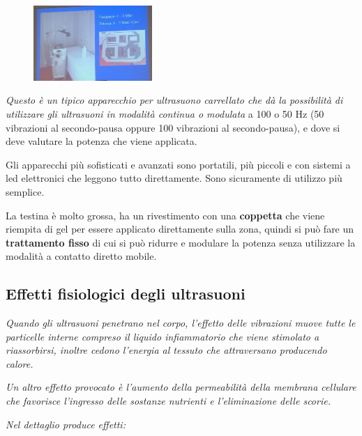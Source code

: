 \begin{figure}[!ht]
\centering
\includegraphics[width=0.4\textwidth]{024/image2.jpeg}
\end{figure}

\emph{Questo
è un tipico apparecchio per ultrasuono carrellato che dà la possibilità
di utilizzare gli ultrasuoni in modalità continua o modulata} a 100 o 50
Hz (50 vibrazioni al secondo-pausa oppure 100 vibrazioni al
secondo-pausa), e dove si deve valutare la potenza che viene applicata.

Gli apparecchi più sofisticati e avanzati sono portatili, più piccoli e
con sistemi a led elettronici che leggono tutto direttamente. Sono
sicuramente di utilizzo più semplice.

La testina è molto grossa, ha un rivestimento con una \textbf{coppetta}
che viene riempita di gel per essere applicato direttamente sulla zona,
quindi si può fare un \textbf{trattamento fisso} di cui si può ridurre e
modulare la potenza senza utilizzare la modalità a contatto diretto
mobile.

\subsection{Effetti fisiologici degli ultrasuoni}

\emph{Quando gli ultrasuoni penetrano nel corpo, l'effetto delle
vibrazioni muove tutte le particelle interne compreso il liquido
infiammatorio che viene stimolato a riassorbirsi, inoltre cedono
l'energia al tessuto che attraversano producendo calore.}

\emph{Un altro effetto provocato è l'aumento della permeabilità della
membrana cellulare che favorisce l'ingresso delle sostanze nutrienti e
l'eliminazione delle scorie.}

\emph{Nel dettaglio produce effetti:}

